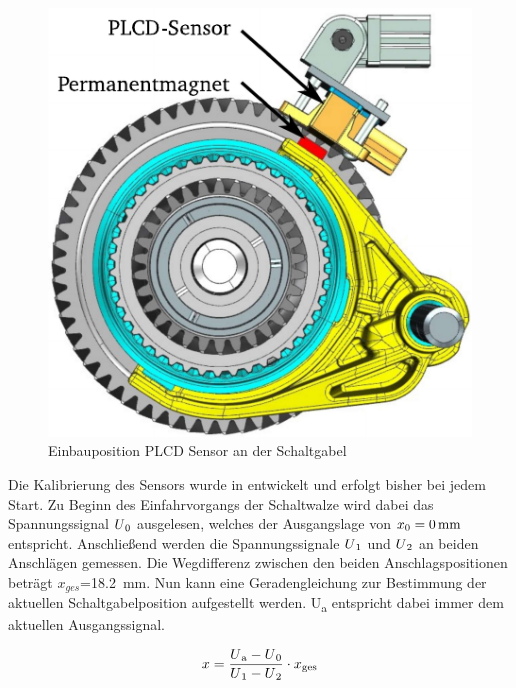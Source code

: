 \begin{figure}[h]
	\centering
		\includegraphics{Bilder/Sensor.pdf}
	\caption{Einbauposition PLCD Sensor an der Schaltgabel \cite[S.14]{adp}}
	\label{fig:Sensor}
\end{figure} \noindent
Die Kalibrierung des Sensors wurde in \cite[S.24f]{messtechnik} entwickelt und erfolgt bisher bei jedem Start. Zu Beginn des Einfahrvorgangs der Schaltwalze wird dabei das Spannungssignal $U\textsubscript{0}$ ausgelesen, welches der Ausgangslage von $x\textsubscript{0}=\SI{0}{mm}$ entspricht. Anschließend werden die Spannungssignale $U\textsubscript{1}$ und $U\textsubscript{2}$ an beiden Anschlägen gemessen. Die Wegdifferenz zwischen den beiden Anschlagspositionen beträgt $x_{ges}$=\SI{18,2}{mm}. Nun kann eine Geradengleichung zur Bestimmung der aktuellen Schaltgabelposition aufgestellt werden. U\textsubscript{a} entspricht dabei immer dem aktuellen Ausgangssignal.

\begin{equation}\label{eq:Lage}
	x=\frac{U\textsubscript{a} -U\textsubscript{0}}{U\textsubscript{1}-U\textsubscript{2}}\cdot x\textsubscript{ges}
\end{equation}

